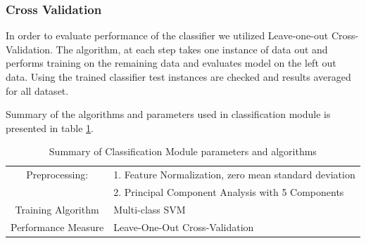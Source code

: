 \subsubsection*{Cross Validation}
In order to evaluate performance of the classifier we utilized Leave-one-out Cross-Validation. The algorithm, at each step takes one instance of data out and performs training on the remaining data and evaluates model on the left out data. Using the trained classifier test instances are checked and results averaged for all dataset.

Summary of the algorithms and parameters used in classification module is presented in table \ref{tbl:classification}.
\begin{table}
\begin{tabular}{|c|l|}
\hline 
Preprocessing: & 1.  Feature Normalization, zero mean standard deviation\\ 
& 2. Principal Component Analysis with 5 Components\\
\hline 
Training Algorithm & Multi-class SVM \\ 
\hline 
Performance Measure & Leave-One-Out Cross-Validation \\ 
\hline 

\end{tabular} 
\caption{Summary of Classification Module parameters and algorithms}
\label{tbl:classification}
\end{table}